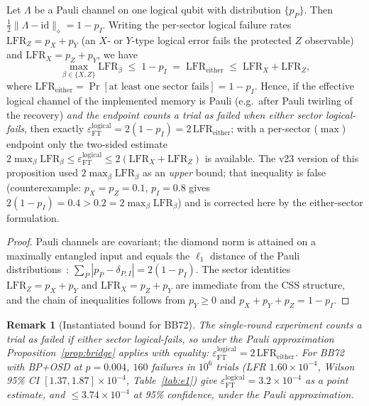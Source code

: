 \documentclass[11pt,a4paper]{article}
\newtheorem{remark}{Remark}
\begin{document}
\begin{proposition}
\label{prop:bridge}
Let $\Lambda$ be a Pauli channel on one logical qubit with distribution
$\{p_P\}$. Then $\tfrac12\|\Lambda-\mathrm{id}\|_\diamond=1-p_I$.
Writing the per-sector logical failure rates
$\mathrm{LFR}_Z=p_X+p_Y$ (an $X$- or $Y$-type logical error fails the
protected $Z$ observable) and $\mathrm{LFR}_X=p_Z+p_Y$, we have
\begin{equation}
\max_{\beta\in\{X,Z\}}\mathrm{LFR}_\beta
\;\le\;1-p_I\;=\;\mathrm{LFR}_{\mathrm{either}}
\;\le\;\mathrm{LFR}_X+\mathrm{LFR}_Z,
\end{equation}
where $\mathrm{LFR}_{\mathrm{either}}=\Pr[\text{at least one sector
fails}]=1-p_I$. Hence, if the effective logical channel of the
implemented memory is Pauli (e.g.\ after Pauli twirling of the
recovery) \emph{and the endpoint counts a trial as failed when either
sector logical-fails}, then exactly
$\varepsilon_{\mathrm{FT}}^{\mathrm{logical}}=2(1-p_I)=
2\,\mathrm{LFR}_{\mathrm{either}}$;
with a per-sector ($\max$) endpoint only the two-sided estimate
$2\max_\beta\mathrm{LFR}_\beta\le
\varepsilon_{\mathrm{FT}}^{\mathrm{logical}}\le
2(\mathrm{LFR}_X+\mathrm{LFR}_Z)$ is available. The v23 version of this
proposition used $2\max_\beta\mathrm{LFR}_\beta$ as an \emph{upper}
bound; that inequality is false (counterexample: $p_X=p_Z=0.1$,
$p_I=0.8$ gives $2(1-p_I)=0.4>0.2=2\max_\beta\mathrm{LFR}_\beta$) and
is corrected here by the either-sector formulation.
\end{proposition}
\begin{proof}
Pauli channels are covariant; the diamond norm is attained on a
maximally entangled input and equals the $\ell_1$ distance of the Pauli
distributions~\cite{Watrous2018}: $\sum_P|p_P-\delta_{P,I}|=2(1-p_I)$.
The sector identities $\mathrm{LFR}_Z=p_X+p_Y$ and
$\mathrm{LFR}_X=p_Z+p_Y$ are immediate from the CSS structure, and the
chain of inequalities follows from $p_Y\ge0$ and
$p_X+p_Y+p_Z=1-p_I$.
\end{proof}
\begin{remark}[Instantiated bound for BB72]\label{rem:bridge-number}
The single-round experiment counts a trial as failed if either sector
logical-fails, so under the Pauli approximation
Proposition~\ref{prop:bridge} applies with equality:
$\varepsilon_{\mathrm{FT}}^{\mathrm{logical}}=
2\,\mathrm{LFR}_{\mathrm{either}}$. For BB72 with BP+OSD at $p=0.004$,
$160$ failures in $10^{6}$ trials (LFR $1.60\times10^{-4}$, Wilson 95\%
CI $[1.37,1.87]\times10^{-4}$, Table~\ref{tab:e1}) give
$\varepsilon_{\mathrm{FT}}^{\mathrm{logical}}=3.2\times10^{-4}$ as a
point estimate, and $\le3.74\times10^{-4}$ at 95\% confidence, under
the Pauli approximation.
\end{remark}
\end{document}
